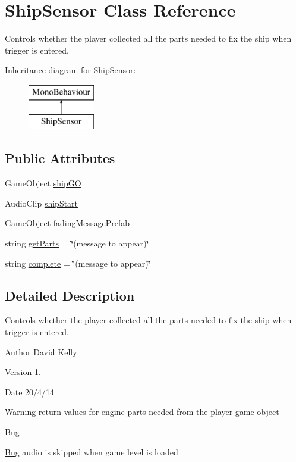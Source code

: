 \hypertarget{class_ship_sensor}{\section{Ship\-Sensor Class Reference}
\label{class_ship_sensor}
}


Controls whether the player collected all the parts needed to fix the ship when trigger is entered.  


Inheritance diagram for Ship\-Sensor\-:\begin{figure}[H]
\begin{center}
\leavevmode
\includegraphics[height=2.000000cm]{class_ship_sensor}
\end{center}
\end{figure}
\subsection*{Public Attributes}
\begin{DoxyCompactItemize}
\item 
Game\-Object \hyperlink{class_ship_sensor_ab6f6fac60964f90237b62bfb62b8b494}{ship\-G\-O}
\item 
Audio\-Clip \hyperlink{class_ship_sensor_aef9b7a32bf81f3b3f234692315a18f12}{ship\-Start}
\item 
Game\-Object \hyperlink{class_ship_sensor_a082be7c2cb3d2ba4505d43028ffc72d3}{fading\-Message\-Prefab}
\item 
string \hyperlink{class_ship_sensor_a12336194b71d77cc4d3512fac5817ff7}{get\-Parts} = \char`\"{}(message to appear)\char`\"{}
\item 
string \hyperlink{class_ship_sensor_a8834195ac644b5dc64c7a9d6a6edc4d6}{complete} = \char`\"{}(message to appear)\char`\"{}
\end{DoxyCompactItemize}


\subsection{Detailed Description}
Controls whether the player collected all the parts needed to fix the ship when trigger is entered. 

\begin{DoxyAuthor}{Author}
David Kelly 
\end{DoxyAuthor}
\begin{DoxyVersion}{Version}
1. 
\end{DoxyVersion}
\begin{DoxyDate}{Date}
20/4/14
\end{DoxyDate}
\begin{DoxyWarning}{Warning}
return values for engine parts needed from the player game object
\end{DoxyWarning}
\begin{DoxyRefDesc}{Bug}
\item[\hyperlink{bug__bug000005}{Bug}]audio is skipped when game level is loaded \end{DoxyRefDesc}


